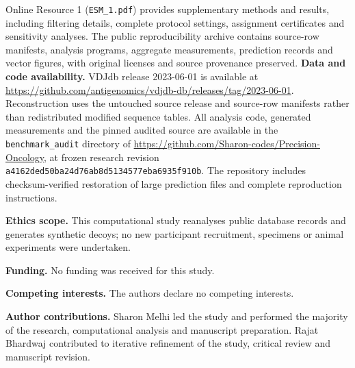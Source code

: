 \documentclass[pdflatex,sn-basic]{sn-jnl}
\begin{document}
\backmatter
{}
Online Resource 1 (\texttt{ESM\_1.pdf}) provides supplementary methods and results, including filtering details, complete protocol settings, assignment certificates and sensitivity analyses. The public reproducibility archive contains source-row manifests, analysis programs, aggregate measurements, prediction records and vector figures, with original licenses and source provenance preserved.
\textbf{Data and code availability.} VDJdb release 2023-06-01 is available at \url{https://github.com/antigenomics/vdjdb-db/releases/tag/2023-06-01}. Reconstruction uses the untouched source release and source-row manifests rather than redistributed modified sequence tables. All analysis code, generated measurements and the pinned audited source are available in the \texttt{benchmark\_audit} directory of \url{https://github.com/Sharon-codes/Precision-Oncology}, at frozen research revision \texttt{a4162ded50ba24d76ab8d5134577eba6935f910b}. The repository includes checksum-verified restoration of large prediction files and complete reproduction instructions.\par
\textbf{Ethics scope.} This computational study reanalyses public database records and generates synthetic decoys; no new participant recruitment, specimens or animal experiments were undertaken.\par
\textbf{Funding.} No funding was received for this study.\par
\textbf{Competing interests.} The authors declare no competing interests.\par
\textbf{Author contributions.} Sharon Melhi led the study and performed the majority of the research, computational analysis and manuscript preparation. Rajat Bhardwaj contributed to iterative refinement of the study, critical review and manuscript revision.
\setlength{\bibsep}{0.45em}

\end{document}
